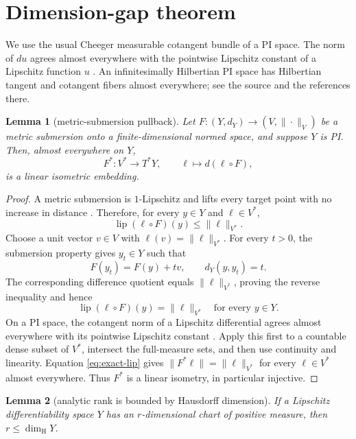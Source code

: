 \documentclass[11pt]{article}
\newtheorem{lemma}{Lemma}
\newcommand{\lip}{\operatorname{lip}}
\newcommand{\dimH}{\dim_{\mathrm H}}
\begin{document}
\section*{Dimension-gap theorem}

We use the usual Cheeger measurable cotangent bundle of a PI space. The norm
of \(du\) agrees almost everywhere with the pointwise Lipschitz constant of a
Lipschitz function \(u\) \cite{cks}. An infinitesimally Hilbertian PI space
has Hilbertian tangent and cotangent fibers almost everywhere; see the source
and the references there.

\begin{lemma}[metric-submersion pullback]\label{lem:pullback}
Let \(F:(Y,d_Y)\to(V,\|\cdot\|_V)\) be a metric submersion onto a
finite-dimensional normed space, and suppose \(Y\) is PI. Then, almost
everywhere on \(Y\),
\[
 F^*:V^*\longrightarrow T^*Y,\qquad
 \ell\longmapsto d(\ell\circ F),
\]
is a linear isometric embedding.
\end{lemma}

\begin{proof}
A metric submersion is \(1\)-Lipschitz and lifts every target point with no
increase in distance \cite[Definition 1.13]{cks}. Therefore, for every
\(y\in Y\) and \(\ell\in V^*\),
\[
 \lip(\ell\circ F)(y)\leq\|\ell\|_{V^*}.
\]
Choose a unit vector \(v\in V\) with
\(\ell(v)=\|\ell\|_{V^*}\). For every \(t>0\), the submersion property gives
\(y_t\in Y\) such that
\[
 F(y_t)=F(y)+tv,\qquad d_Y(y,y_t)=t.
\]
The corresponding difference quotient equals \(\|\ell\|_{V^*}\), proving
the reverse inequality and hence
\begin{equation}\label{eq:exact-lip}
 \lip(\ell\circ F)(y)=\|\ell\|_{V^*}
 \quad\text{for every }y\in Y.
\end{equation}
On a PI space, the cotangent norm of a Lipschitz differential agrees almost
everywhere with its pointwise Lipschitz constant \cite{cks}. Apply this first
to a countable dense subset of \(V^*\), intersect the full-measure sets, and
then use continuity and linearity. Equation \eqref{eq:exact-lip} gives
\(\|F^*\ell\|=\|\ell\|_{V^*}\) for every \(\ell\in V^*\) almost everywhere.
Thus \(F^*\) is a linear isometry, in particular injective.
\end{proof}

\begin{lemma}[analytic rank is bounded by Hausdorff dimension]
If a Lipschitz differentiability space \(Y\) has an \(r\)-dimensional chart of
positive measure, then \(r\leq\dimH Y\).
\end{lemma}
\end{document}
